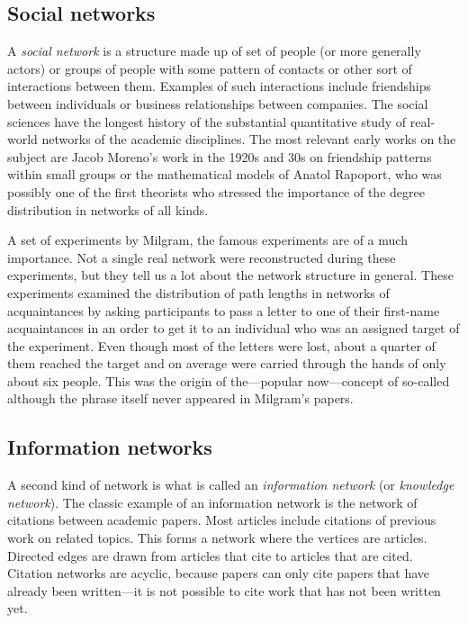     \subsection{Social networks}

      A \emph{social network} is a structure made up of set of people (or more generally actors) or groups of people with some pattern of contacts or other sort of interactions between them\cite{WassermanFaust1994}. Examples of such interactions include friendships between individuals or business relationships between companies. The social sciences have the longest history of the substantial quantitative study of real-world networks of the academic disciplines\cite{WassermanFaust1994}. The most relevant early works on the subject are Jacob Moreno's work in the 1920s and 30s on friendship patterns within small groups\cite{Moreno1934} or the mathematical models of Anatol Rapoport\cite{Rapoport1957}, who was possibly one of the first theorists who stressed the importance of the degree distribution in networks of all kinds.

      A set of experiments by Milgram, the famous  experiments\cite{Milgram1967} are of a much importance. Not a single real network were reconstructed during these experiments, but they tell us a lot about the network structure in general. These experiments examined the distribution of path lengths in networks of acquaintances by asking participants to pass a letter to one of their first-name acquaintances in an order to get it to an individual who was an assigned target of the experiment. Even though most of the letters were lost, about a quarter of them reached the target and on average were carried through the hands of only about six people. This was the origin of the---popular now---concept of so-called  although the phrase itself never appeared in Milgram's papers.

    \subsection{Information networks}

      A second kind of network is what is called an \emph{information network} (or \emph{knowledge network}). The classic example of an information network is the network of citations between academic papers\cite{Egghe1990}. Most articles include citations of previous work on related topics. This forms a network where the vertices are articles. Directed edges are drawn from articles that cite to articles that are cited. Citation networks are acyclic, because papers can only cite papers that have already been written---it is not possible to cite work that has not been written yet.

